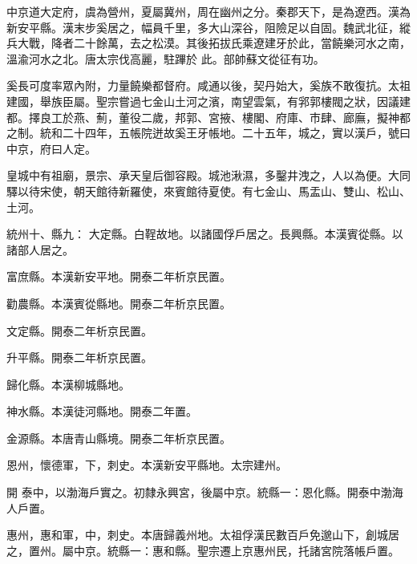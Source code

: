 
\begin{pinyinscope}

 中京道大定府，虞為營州，夏屬冀州，周在幽州之分。秦郡天下，是為遼西。漢為新安平縣。漢末步奚居之，幅員千里，多大山深谷，阻險足以自固。魏武北征，縱兵大戰，降者二十餘萬，去之松漠。其後拓拔氏乘遼建牙於此，當饒樂河水之南，溫渝河水之北。唐太宗伐高麗，駐蹕於
 此。部帥蘇文從征有功。



 奚長可度率眾內附，力量饒樂都督府。咸通以後，契丹始大，奚族不敢復抗。太祖建國，舉族臣屬。聖宗嘗過七金山土河之濱，南望雲氣，有郛郭樓閥之狀，因議建都。擇良工於燕、薊，董役二歲，邦郭、宮掖、樓閣、府庫、市肆、廊廡，擬神都之制。統和二十四年，五帳院迸故奚王牙帳地。二十五年，城之，實以漢戶，號曰中京，府曰人定。



 皇城中有祖廟，景宗、承天皇后御容殿。城池湫濕，多鑿井洩之，人以為便。大同驛以待宋使，朝天館待新羅使，來賓館待夏使。有七金山、馬盂山、雙山、松山、土河。



 統州十、縣九：
 大定縣。白鞓故地。以諸國俘戶居之。長興縣。本漢賓從縣。以諸部人居之。



 富庶縣。本漢新安平地。開泰二年析京民置。



 勸農縣。本漢賓從縣地。開泰二年析京民置。



 文定縣。開泰二年析京民置。



 升平縣。開泰二年析京民置。



 歸化縣。本漢柳城縣地。



 神水縣。本漢徒河縣地。開泰二年置。



 金源縣。本唐青山縣境。開泰二年析京民置。



 恩州，懷德軍，下，刺史。本漢新安平縣地。太宗建州。



 開
 泰中，以渤海戶實之。初隸永興宮，後屬中京。統縣一：恩化縣。開泰中渤海人戶置。



 惠州，惠和軍，中，刺史。本唐歸義州地。太祖俘漢民數百戶免邈山下，創城居之，置州。屬中京。統縣一：惠和縣。聖宗遷上京惠州民，托諸宮院落帳戶置。




\end{pinyinscope}
